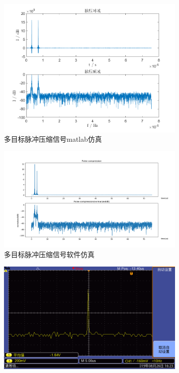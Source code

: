 \documentclass{article}
\newcounter{sub}
\begin{document}
\begin{figure}[H]
	\centering
	\begin{subfigure}[H]{.45\linewidth}
		\centering
		\includegraphics[width=\linewidth]{two-pulse-matlab.png}
		\caption{多目标脉冲压缩信号matlab仿真}
		\label{fig:多目标脉冲压缩信号matlab仿真}
	\end{subfigure}
	\quad
	\begin{subfigure}[H]{.45\linewidth}
		\centering
		\includegraphics[width=\linewidth]{two-pulse-software.png}
		\caption{多目标脉冲压缩信号软件仿真}
		\label{fig:多目标脉冲压缩信号软件仿真}
	\end{subfigure}
	\quad
	\begin{subfigure}[H]{.45\linewidth}
		\centering
		\includegraphics[width=\linewidth]{two-pulse-hardware.png}

\end{subfigure}
\end{figure}
\end{document}
